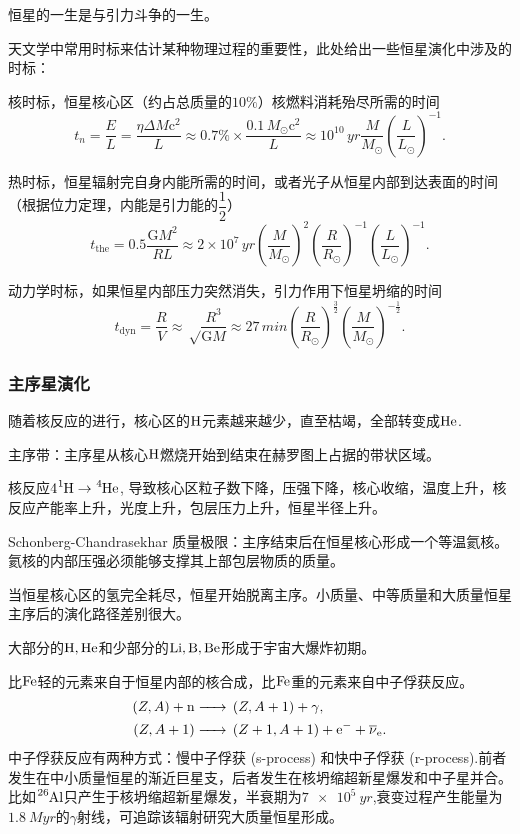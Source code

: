 \documentclass[../天体物理基础.tex]{subfiles}
\begin{document}
恒星的一生是与引力斗争的一生。

天文学中常用时标来估计某种物理过程的重要性，此处给出一些恒星演化中涉及的时标：

核时标，恒星核心区（约占总质量的$10\%$）核燃料消耗殆尽所需的时间
\begin{equation}
t_{n}=\frac{E}{L}=\frac{\eta\Delta{}M\mathrm{c}^{2}}{L}\approx0.7\%\times\frac{0.1\,M_{\odot}\mathrm{c}^{2}}{L}\approx10^{10}\,\unit{yr}\frac{M}{\unit{M_{\odot}}}\left(\frac{L}{\unit{L_{\odot}}}\right)^{-1}.
\end{equation}

热时标，恒星辐射完自身内能所需的时间，或者光子从恒星内部到达表面的时间（根据位力定理，内能是引力能的$\dfrac{1}{2}$）
\begin{equation}
t_{\text{the}}=0.5\frac{\mathrm{G}M^{2}}{RL}\approx2\times10^{7}\,\unit{yr}\left(\frac{M}{\unit{M_{\odot}}}\right)^{2}\left(\frac{R}{\unit{R_{\odot}}}\right)^{-1}\left(\frac{L}{\unit{L_{\odot}}}\right)^{-1}.
\end{equation}

动力学时标，如果恒星内部压力突然消失，引力作用下恒星坍缩的时间
\begin{equation}
t_{\text{dyn}}=\frac{R}{V}\approx\sqrt\frac{R^{3}}{\mathrm{G}M}\approx27\,\unit{min}\left(\frac{R}{\unit{R_{\odot}}}\right)^{\frac{3}{2}}\left(\frac{M}{\unit{M_{\odot}}}\right)^{-\frac{1}{2}}.
\end{equation}

\subsubsection{主序星演化}
随着核反应的进行，核心区的$\ce{H}$元素越来越少，直至枯竭，全部转变成$\ce{He}$.

主序带：主序星从核心$\ce{H}$燃烧开始到结束在赫罗图上占据的带状区域。

核反应$4\ce{^{1}H}\to\ce{^{4}He}$, 导致核心区粒子数下降，压强下降，核心收缩，温度上升，核反应产能率上升，光度上升，包层压力上升，恒星半径上升。

Schonberg-Chandrasekhar 质量极限：主序结束后在恒星核心形成一个等温氦核。氦核的内部压强必须能够支撑其上部包层物质的质量。

当恒星核心区的氢完全耗尽，恒星开始脱离主序。小质量、中等质量和大质量恒星主序后的演化路径差别很大。

大部分的$\ce{H,He}$和少部分的$\ce{Li,B,Be}$形成于宇宙大爆炸初期。

比$\ce{Fe}$轻的元素来自于恒星内部的核合成，比$\ce{Fe}$重的元素来自中子俘获反应。
\begin{align}
\left(Z,A\right)+\ce{n &->}\left(Z,A+1\right)+\gamma,\\
\left(Z,A+1\right)\ce{&->}\left(Z+1,A+1\right)+\ce{e-}+\overline{\nu}_{\ce{e}}.
\end{align}
中子俘获反应有两种方式：慢中子俘获 (s-process) 和快中子俘获 (r-process).前者发生在中小质量恒星的渐近巨星支，后者发生在核坍缩超新星爆发和中子星并合。比如$\ce{^{26}Al}$只产生于核坍缩超新星爆发，半衰期为$\qty{7e5}{yr}$,衰变过程产生能量为$\qty{1.8}{Myr}$的$\gamma$射线，可追踪该辐射研究大质量恒星形成。
\end{document}
